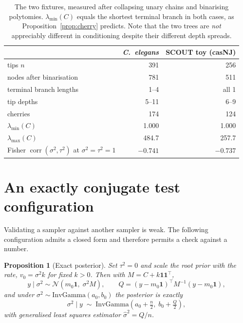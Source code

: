 \documentclass[11pt]{article}
\newtheorem{proposition}{Proposition}
\theoremstyle{remark}
\newcommand{\Norm}{\mathcal{N}}
\newcommand{\one}{\mathbf{1}}
\begin{document}
\begin{table}[t]
\centering
\begin{tabular}{lrr}
\toprule
 & \emph{C.\ elegans} & SCOUT toy (casNJ) \\
\midrule
tips $n$                                   & 391      & 256 \\
nodes after binarisation                   & 781      & 511 \\
terminal branch lengths                    & 1--4     & all 1 \\
tip depths                                 & 5--11    & 6--9 \\
cherries                                   & 174      & 124 \\
$\lambda_{\min}(C)$                        & 1.000    & 1.000 \\
$\lambda_{\max}(C)$                        & 484.7    & 257.7 \\
Fisher $\operatorname{corr}(\sigma^2,\tau^2)$ at $\sigma^2=\tau^2=1$ & $-0.741$ & $-0.737$ \\
\bottomrule
\end{tabular}
\caption{The two fixtures, measured after collapsing unary chains and binarising polytomies.
$\lambda_{\min}(C)$ equals the shortest terminal branch in both cases, as
Proposition~\ref{prop:cherry} predicts. Note that the two trees are \emph{not} appreciably different
in conditioning despite their different depth spreads.}
\label{tab:fixtures}
\end{table}

\section{An exactly conjugate test configuration}

Validating a sampler against another sampler is weak. The following configuration admits a closed
form and therefore permits a check against a number.

\begin{proposition}[Exact posterior]
Set $\tau^2 = 0$ and scale the root prior with the rate, $v_0 = \sigma^2 k$ for fixed $k > 0$. Then
with $M = C + k\one\one^{\!\top}$,
\begin{equation}
  y \mid \sigma^2 \sim \Norm\!\left(m_0\one,\; \sigma^2 M\right),
  \qquad
  Q = (y - m_0\one)^{\!\top} M^{-1} (y - m_0\one),
\end{equation}
and under $\sigma^2 \sim \mathrm{InvGamma}(a_0,b_0)$ the posterior is exactly
\begin{equation}
  \sigma^2 \mid y \;\sim\; \mathrm{InvGamma}\!\left(a_0 + \tfrac{n}{2},\; b_0 + \tfrac{Q}{2}\right),
  \label{eq:conjugate}
\end{equation}
with generalised least squares estimator $\hat{\sigma}^2 = Q/n$.
\end{proposition}
\end{document}
